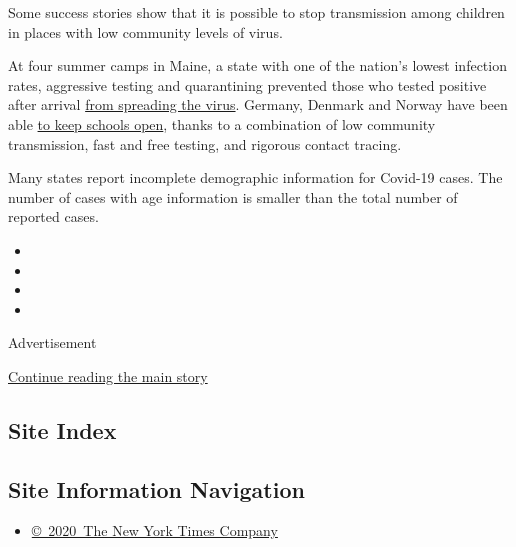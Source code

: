 Some success stories show that it is possible to stop transmission among
children in places with low community levels of virus.

At four summer camps in Maine, a state with one of the nation's lowest
infection rates, aggressive testing and quarantining prevented those who
tested positive after arrival
\href{https://www.cdc.gov/mmwr/volumes/69/wr/mm6935e1.htm?s_cid=mm6935e1_w}{from
spreading the virus}. Germany, Denmark and Norway have been able
\href{https://www.nytimes3xbfgragh.onion/2020/08/26/world/europe/germany-schools-virus-reopening.html}{to
keep schools open}, thanks to a combination of low community
transmission, fast and free testing, and rigorous contact tracing.

Many states report incomplete demographic information for Covid-19
cases. The number of cases with age information is smaller than the
total number of reported cases.

\begin{itemize}
\item
\item
\item
\item
\end{itemize}

Advertisement

\protect\hyperlink{after-bottom}{Continue reading the main story}

\hypertarget{site-index}{%
\subsection{Site Index}\label{site-index}}

\hypertarget{site-information-navigation}{%
\subsection{Site Information
Navigation}\label{site-information-navigation}}

\begin{itemize}
\tightlist
\item
  \href{https://help.nytimes3xbfgragh.onion/hc/en-us/articles/115014792127-Copyright-notice}{©~2020~The
  New York Times Company}
\end{itemize}

